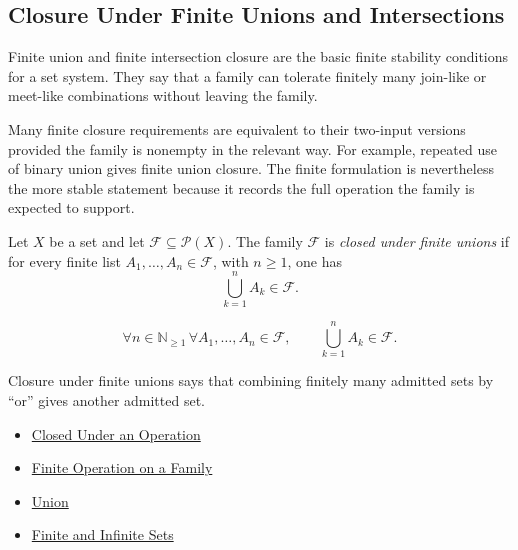 \subsection{Closure Under Finite Unions and Intersections}

\begin{remark*}[Exposition]
Finite union and finite intersection closure are the basic finite stability
conditions for a set system.  They say that a family can tolerate finitely
many join-like or meet-like combinations without leaving the family.
\end{remark*}

\begin{remark*}[Exposition]
Many finite closure requirements are equivalent to their two-input versions
provided the family is nonempty in the relevant way.  For example, repeated
use of binary union gives finite union closure.  The finite formulation is
nevertheless the more stable statement because it records the full operation
the family is expected to support.
\end{remark*}

\begin{definition}\label{def:closed-under-finite-unions}
Let \(X\) be a set and let \(\mathcal{F}\subseteq\mathcal{P}(X)\).  The family
\(\mathcal{F}\) is \emph{closed under finite unions} if for every finite list
\(A_1,\dots,A_n\in\mathcal{F}\), with \(n\geq 1\), one has
\[
  \bigcup_{k=1}^{n} A_k \in \mathcal{F}.
\]
\end{definition}

\begin{remark*}
\[
  \forall n\in\mathbb{N}_{\geq 1}\,
  \forall A_1,\dots,A_n\in\mathcal{F},\qquad
  \bigcup_{k=1}^{n}A_k\in\mathcal{F}.
\]
\end{remark*}

\begin{remark*}[Interpretation]
Closure under finite unions says that combining finitely many admitted sets by
``or'' gives another admitted set.
\end{remark*}

\begin{dependencies}
\begin{itemize}
  \item \hyperref[def:closed-under-operation]{Closed Under an Operation}
  \item \hyperref[def:finite-operation-on-family]{Finite Operation on a Family}
  \item \hyperref[def:union]{Union}
  \item \hyperref[def:finite-infinite]{Finite and Infinite Sets}
\end{itemize}
\end{dependencies}

